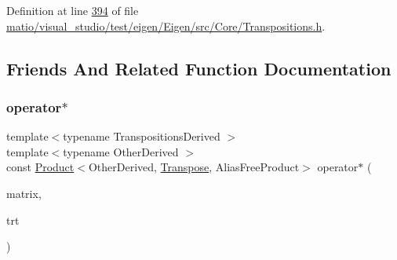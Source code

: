 Definition at line \hyperlink{matio_2visual__studio_2test_2eigen_2_eigen_2src_2_core_2_transpositions_8h_source_l00394}{394} of file \hyperlink{matio_2visual__studio_2test_2eigen_2_eigen_2src_2_core_2_transpositions_8h_source}{matio/visual\+\_\+studio/test/eigen/\+Eigen/src/\+Core/\+Transpositions.\+h}.



\subsection{Friends And Related Function Documentation}
\mbox{\label{class_eigen_1_1_transpose_3_01_transpositions_base_3_01_transpositions_derived_01_4_01_4_af58db34e3932489e71803efae5dd3207}} 
\subsubsection{\texorpdfstring{operator$\ast$}{operator*}\hspace{0.1cm}{\footnotesize\ttfamily [1/2]}}
{\footnotesize\ttfamily template$<$typename Transpositions\+Derived $>$ \\
template$<$typename Other\+Derived $>$ \\
const \hyperlink{group___core___module_class_eigen_1_1_product}{Product}$<$Other\+Derived, \hyperlink{group___core___module_class_eigen_1_1_transpose}{Transpose}, Alias\+Free\+Product$>$ operator$\ast$ (\begin{DoxyParamCaption}\item[{const \hyperlink{group___core___module_class_eigen_1_1_matrix_base}{Matrix\+Base}$<$ Other\+Derived $>$ \&}]{matrix,  }\item[{const \hyperlink{group___core___module_class_eigen_1_1_transpose}{Transpose}$<$ \hyperlink{class_eigen_1_1_transpositions_base}{Transpositions\+Base}$<$ Transpositions\+Derived $>$ $>$ \&}]{trt }\end{DoxyParamCaption})\hspace{0.3cm}{\ttfamily [friend]}}

